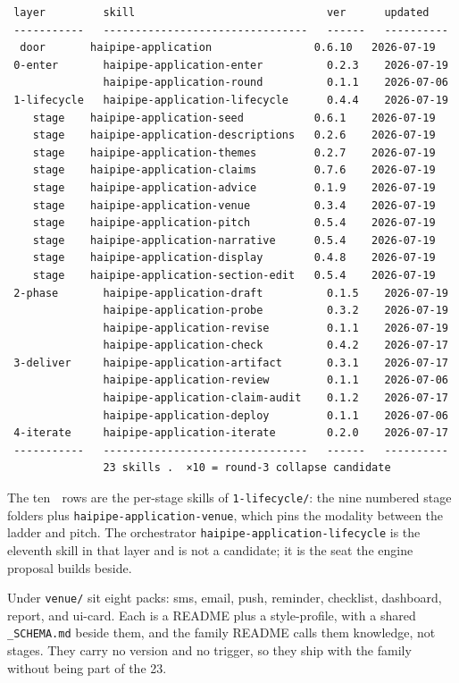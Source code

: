 \begin{verbatim}
 layer         skill                              ver      updated
 -----------   --------------------------------   ------   ----------
  door       haipipe-application                0.6.10   2026-07-19
 0-enter       haipipe-application-enter          0.2.3    2026-07-19
               haipipe-application-round          0.1.1    2026-07-06
 1-lifecycle   haipipe-application-lifecycle      0.4.4    2026-07-19
    stage    haipipe-application-seed           0.6.1    2026-07-19
    stage    haipipe-application-descriptions   0.2.6    2026-07-19
    stage    haipipe-application-themes         0.2.7    2026-07-19
    stage    haipipe-application-claims         0.7.6    2026-07-19
    stage    haipipe-application-advice         0.1.9    2026-07-19
    stage    haipipe-application-venue          0.3.4    2026-07-19
    stage    haipipe-application-pitch          0.5.4    2026-07-19
    stage    haipipe-application-narrative      0.5.4    2026-07-19
    stage    haipipe-application-display        0.4.8    2026-07-19
    stage    haipipe-application-section-edit   0.5.4    2026-07-19
 2-phase       haipipe-application-draft          0.1.5    2026-07-19
               haipipe-application-probe          0.3.2    2026-07-19
               haipipe-application-revise         0.1.1    2026-07-19
               haipipe-application-check          0.4.2    2026-07-17
 3-deliver     haipipe-application-artifact       0.3.1    2026-07-17
               haipipe-application-review         0.1.1    2026-07-06
               haipipe-application-claim-audit    0.1.2    2026-07-17
               haipipe-application-deploy         0.1.1    2026-07-06
 4-iterate     haipipe-application-iterate        0.2.0    2026-07-17
 -----------   --------------------------------   ------   ----------
               23 skills .  ×10 = round-3 collapse candidate
\end{verbatim}
The ten 🔻 rows are the per-stage skills of \texttt{1-lifecycle/}: the nine numbered stage folders plus \texttt{haipipe-application-venue}, which pins the modality between the ladder and pitch. The orchestrator \texttt{haipipe-application-lifecycle} is the eleventh skill in that layer and is not a candidate; it is the seat the engine proposal builds beside.

Under \texttt{venue/} sit eight packs: sms, email, push, reminder, checklist, dashboard, report, and ui-card. Each is a README plus a style-profile, with a shared \texttt{\_SCHEMA.md} beside them, and the family README calls them knowledge, not stages. They carry no version and no trigger, so they ship with the family without being part of the 23.

